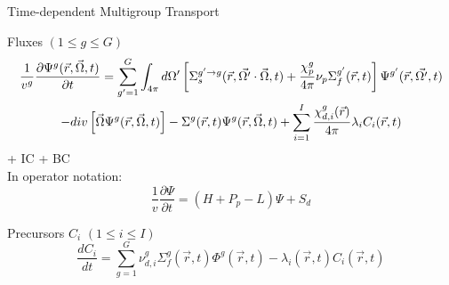 \documentclass[8pt]{beamer}
\newcommand{\be}{\begin{equation}}
\newcommand{\ee}{\end{equation}}
\begin{document}
\begin{frame}{Time-dependent Multigroup Transport}


\begin{block}{Fluxes $(1 \le g \le G )$}
\begin{multline}
\frac{1}{v^g}\frac{\partial \Psi^g ( \vec{r},\vec{\Omega },t) }{\partial t} 
=
\sum_{g^\prime=1}^{G} \int\nolimits_{4\pi }d\Omega ^{\prime }
\left[
\Sigma _{s}^{g^\prime\to g}(\vec{r},\vec{\Omega ^{\prime }} \cdot \vec{\Omega },t)
+ 
\frac{\chi _{p}^g}{4\pi } \nu_{p}\Sigma ^{g^\prime}_{f}(\vec{r},t)
\right]
\Psi^{g^\prime} ( \vec{r},\vec{\Omega ^{\prime }},t)  \\
% 
-div\left[ \vec{\Omega }\Psi ^g ( \vec{r},\vec{\Omega },t) \right]
-\Sigma ^g(\vec{r},t)\Psi ^g( \vec{r},\vec{\Omega },t) 
%
+\sum\limits_{i=1}^{I} \frac{\chi ^g _{d,i}(\vec{r})}{4\pi} \lambda _{i}C_{i}(\vec{r},t)  \notag 
\end{multline}
+ IC + BC \\
\medskip
In operator notation:
\begin{equation*}
\boxed{
\frac{1}{v}\frac{\partial \Psi }{\partial t} = (H + P_p - L) \Psi  + S_{d} 
}
\end{equation*}
\end{block}

\vspace{-4mm}

\begin{block}{Precursors $C_i$ $(1 \le i \le I)$}
\begin{equation*}
\boxed{
\frac{dC_i}{dt} = \sum_{g=1}^G \nu_{d,i}^{g} \Sigma_f^g(\vec{r},t) \Phi^{g}(\vec{r},t) - \lambda_i(\vec{r},t) C_i(\vec{r},t) 
}
\end{equation*}
\end{block}

\end{frame}
%
%
\end{document}
